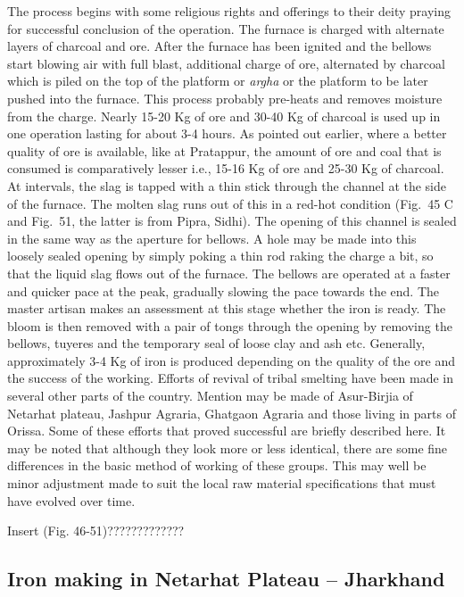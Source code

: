 The process begins with some religious rights and offerings to their deity praying for successful conclusion of the operation. The furnace is charged with alternate layers of charcoal and ore. After the furnace has been ignited and the bellows start blowing air with full blast, additional charge of ore, alternated by charcoal which is piled on the top of the platform or {\it argha} or the platform to be later pushed into the furnace. This process probably pre-heats and removes moisture from the charge. Nearly 15-20 Kg of ore and 30-40 Kg of charcoal is used up in one operation lasting for about 3-4 hours. As pointed out earlier, where a better quality of ore is available, like at Pratappur, the amount of ore and coal that is consumed is comparatively lesser i.e., 15-16 Kg of ore and 25-30 Kg of charcoal. At intervals, the slag is tapped with a thin stick through the channel at the side of the furnace. The molten slag runs out of this in a red-hot condition (Fig.~45 C and Fig.~51, the latter is from Pipra, Sidhi). The opening of this channel is sealed in the same way as the aperture for bellows. A hole may be made into this loosely sealed opening by simply poking a thin rod raking the charge a bit, so that the liquid slag flows out of the furnace. The bellows are operated at a faster and quicker pace at the peak, gradually slowing the pace towards the end. The master artisan makes an assessment at this stage whether the iron is ready. The bloom is then removed with a pair of tongs through the opening by removing the bellows, tuyeres and the temporary seal of loose clay and ash etc. Generally, approximately 3-4 Kg of iron is produced depending on the quality of the ore and the success of the working. Efforts of revival of tribal smelting have been made in several other parts of the country. Mention may be made of Asur-Birjia of Netarhat plateau, Jashpur Agraria, Ghatgaon Agraria and those living in parts of Orissa. Some of these efforts that proved successful are briefly described here. It may be noted that although they look more or less identical, there are some fine differences in the basic method of working of these groups. This may well be minor adjustment made to suit the local raw material specifications that must have evolved over time.

Insert (Fig. 46-51)?????????????

\vspace{-.3cm}

\subsection*{Iron making in Netarhat Plateau – Jharkhand}\label{chapter7-subsection-7.1b}


